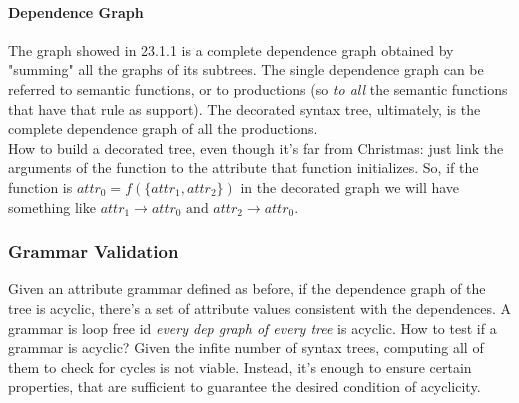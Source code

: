 				\paragraph{Dependence Graph}
					The graph showed in 23.1.1 is a complete dependence graph obtained by "summing" all the graphs of its subtrees. The single dependence graph can be referred to semantic functions, or to productions (so \emph{to all} the semantic functions that have that rule as support). The decorated syntax tree, ultimately, is the complete dependence graph of all the productions.\\
					How to build a decorated tree, even though it's far from Christmas: just link the arguments of the function to the attribute that function initializes. So, if the function is $attr_0 = f(\{attr_1, attr_2\})$ in the decorated graph we will have something like $attr_1 \rightarrow attr_0 \text{ and } attr_2 \rightarrow attr_0$.
			
			\subsubsection{Grammar Validation}
				Given an attribute grammar defined as before, if the dependence graph of the tree is acyclic, there's a set of attribute values consistent with the dependences. A grammar is loop free id \emph{every dep graph of every tree} is acyclic. How to test if a grammar is acyclic? Given the infite number of syntax trees, computing all of them to check for cycles is not viable. Instead, it's enough to ensure certain properties, that are sufficient to guarantee the desired condition of acyclicity.
				
